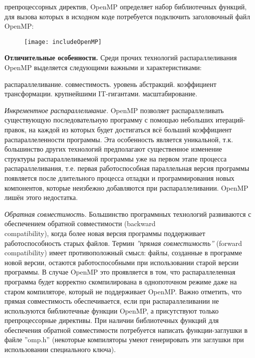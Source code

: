 {\begin{table}[H]
\begin{center}
		\end{center}
	\end{table}
	 препроцессорных директив, OpenMP определяет набор библиотечных функций, для вызова которых в исходном коде потребуется подключить заголовочный файл OpenMP:
	\begin{figure}[H]
		\texttt{[image: includeOpenMP]}
	\end{figure}
	\par\textbf{Отличительные особенности.} Среди прочих технологий распараллеливания OpenMP выделяется следующими важными и характеристиками:
	\begin{itemize}
		 распараллеливание.
		 совместимость.
		 уровень абстракций.
		 коэффициент трансформации.
		 крупнейшими  IT-гигантами. 
		 масштабирование.
	\end{itemize}
	\par\textit{Инкрементное распараллеливание.}  OpenMP позволяет распараллеливать существующую последовательную программу с помощью небольших итераций-правок, на каждой из которых будет достигаться всё больший коэффициент распараллеленности программы. Эта особенность является уникальной, т.к. большинство других технологий предполагают существенное изменение структуры распараллеливаемой программы уже на первом этапе процесса распараллеливания, т.е. первая работоспособная параллельная версия программы появляется после длительного процесса отладки и программирования новых компонентов, которые неизбежно добавляются при распараллеливании. OpenMP лишён этого недостатка.
	\par\textit{Обратная совместимость.} Большинство программных технологий развиваются с обеспечением обратной совместимости (backward \\compatibility), когда более новая версия программы поддерживает работоспособность старых файлов. Термин \textit{''прямая совместимость''} (forward compatibility) имеет противоположный смысл: файлы, созданные в программе новой версии, остаются работоспособными при использовании старой версии программы. В случае OpenMP это проявляется в том, что распараллеленная программа будет корректно скомпилирована в однопоточном режиме даже на старом компиляторе, который не поддерживает OpenMP. Важно отметить, что прямая совместимость обеспечивается, если при распараллеливании не используются библиотечные функции OpenMP, а присутствуют только препроцессорные директивы. При наличии библиотечных функций для обеспечения обратной совместимости потребуется написать функции-заглушки в файле ''omp.h'' (некоторые компиляторы умеют генерировать эти заглушки при использовании специального ключа).
}
